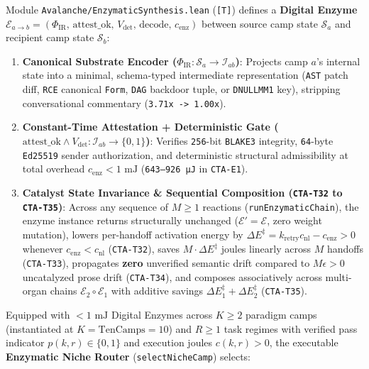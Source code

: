 \documentclass[10pt,letterpaper]{article}
\providecommand{\tightlist}{\setlength{\itemsep}{1pt}\setlength{\parskip}{0pt}}
\begin{document}
Module \texttt{Avalanche/\allowbreak{}EnzymaticSynthesis.\allowbreak{}lean} (\texttt{{[}T{]}})
defines a \textbf{Digital Enzyme}
\(\mathcal{E}_{a \to b} = (\Phi_{\text{IR}},\, \mathrm{attest\_ok},\, V_{\text{det}},\, \mathrm{decode},\, c_{\text{enz}})\)
between source camp state \(\mathcal{S}_a\) and recipient camp state
\(\mathcal{S}_b\):

\begin{enumerate}
\def\labelenumi{\arabic{enumi}.}
\tightlist
\item
  \textbf{Canonical Substrate Encoder
  (\(\Phi_{\text{IR}} : \mathcal{S}_a \to \mathcal{I}_{ab}\))}: Projects
  camp \(a\)'s internal state into a minimal, schema-typed intermediate
  representation (\texttt{AST} patch diff, \texttt{RCE} canonical
  \texttt{Form}, \texttt{DAG} backdoor tuple, or \texttt{DNULLMM1} key),
  stripping conversational commentary
  (\texttt{3.71x\ -\textgreater{}\ 1.00x}).
\item
  \textbf{Constant-Time Attestation + Deterministic Gate
  (\(\mathrm{attest\_ok} \wedge V_{\text{det}} : \mathcal{I}_{ab} \to \{0,1\}\))}:
  Verifies \texttt{256}-bit \texttt{BLAKE3} integrity, \texttt{64}-byte
  \texttt{Ed25519} sender authorization, and deterministic structural
  admissibility at total overhead \(c_{\text{enz}} < 1\text{ mJ}\)
  (\texttt{643–926\ µJ} in \texttt{CTA-E1}).
\item
  \textbf{Catalyst State Invariance \& Sequential Composition
  (\texttt{CTA-T32} to \texttt{CTA-T35})}: Across any sequence of
  \(M \ge 1\) reactions (\texttt{runEnzymaticChain}), the enzyme
  instance returns structurally unchanged
  (\(\mathcal{E}' = \mathcal{E}\), zero weight mutation), lowers
  per-handoff activation energy by
  \(\Delta E^\ddagger = k_{\text{retry}} c_{\text{nl}} - c_{\text{enz}} > 0\)
  whenever \(c_{\text{enz}} < c_{\text{nl}}\) (\texttt{CTA-T32}), saves
  \(M \cdot \Delta E^\ddagger\) joules linearly across \(M\) handoffs
  (\texttt{CTA-T33}), propagates \textbf{zero} unverified semantic drift
  compared to \(M\epsilon > 0\) uncatalyzed prose drift
  (\texttt{CTA-T34}), and composes associatively across multi-organ
  chains \(\mathcal{E}_2 \circ \mathcal{E}_1\) with additive savings
  \(\Delta E^\ddagger_1 + \Delta E^\ddagger_2\) (\texttt{CTA-T35}).
\end{enumerate}

Equipped with \(< 1\text{ mJ}\) Digital Enzymes across \(K \ge 2\)
paradigm camps (instantiated at \(K = \mathrm{TenCamps} = 10\)) and
\(R \ge 1\) task regimes with verified pass indicator
\(p(k, r) \in \{0, 1\}\) and execution joules \(c(k, r) > 0\), the
executable \textbf{Enzymatic Niche Router} (\texttt{selectNicheCamp})
selects:
\end{document}
